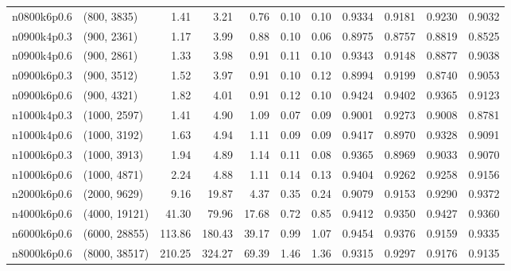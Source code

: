 \begin{tabular}{llrrrrrrrrr}
n0800k6p0.6 &   (800, 3835) &   1.41 &   3.21 &  0.76 &  0.10 &   0.10 &   0.9334 &   0.9181 &     0.9230 &      0.9032 \\
n0900k4p0.3 &   (900, 2361) &   1.17 &   3.99 &  0.88 &  0.10 &   0.06 &   0.8975 &   0.8757 &     0.8819 &      0.8525 \\
n0900k4p0.6 &   (900, 2861) &   1.33 &   3.98 &  0.91 &  0.11 &   0.10 &   0.9343 &   0.9148 &     0.8877 &      0.9038 \\
n0900k6p0.3 &   (900, 3512) &   1.52 &   3.97 &  0.91 &  0.10 &   0.12 &   0.8994 &   0.9199 &     0.8740 &      0.9053 \\
n0900k6p0.6 &   (900, 4321) &   1.82 &   4.01 &  0.91 &  0.12 &   0.10 &   0.9424 &   0.9402 &     0.9365 &      0.9123 \\
n1000k4p0.3 &  (1000, 2597) &   1.41 &   4.90 &  1.09 &  0.07 &   0.09 &   0.9001 &   0.9273 &     0.9008 &      0.8781 \\
n1000k4p0.6 &  (1000, 3192) &   1.63 &   4.94 &  1.11 &  0.09 &   0.09 &   0.9417 &   0.8970 &     0.9328 &      0.9091 \\
n1000k6p0.3 &  (1000, 3913) &   1.94 &   4.89 &  1.14 &  0.11 &   0.08 &   0.9365 &   0.8969 &     0.9033 &      0.9070 \\
n1000k6p0.6 &  (1000, 4871) &   2.24 &   4.88 &  1.11 &  0.14 &   0.13 &   0.9404 &   0.9262 &     0.9258 &      0.9156 \\
n2000k6p0.6 &  (2000, 9629) &   9.16 &  19.87 &  4.37 &  0.35 &   0.24 &   0.9079 &   0.9153 &     0.9290 &      0.9372 \\
n4000k6p0.6 & (4000, 19121) &  41.30 &  79.96 & 17.68 &  0.72 &   0.85 &   0.9412 &   0.9350 &     0.9427 &      0.9360 \\
n6000k6p0.6 & (6000, 28855) & 113.86 & 180.43 & 39.17 &  0.99 &   1.07 &   0.9454 &   0.9376 &     0.9159 &      0.9335 \\
n8000k6p0.6 & (8000, 38517) & 210.25 & 324.27 & 69.39 &  1.46 &   1.36 &   0.9315 &   0.9297 &     0.9176 &      0.9135 \\
\bottomrule
\end{tabular}
